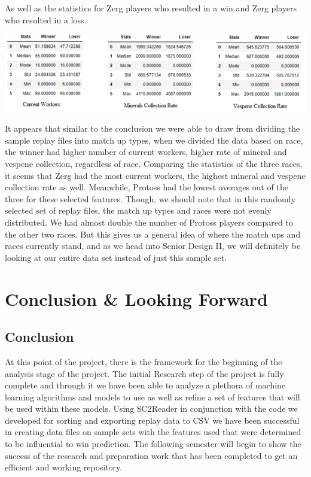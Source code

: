 \documentclass[a4paper,12pt]{report}
\begin{document}
As well as the statistics for Zerg players who resulted in a win and Zerg players who resulted in a loss. 

\begin{center}
    \captionsetup{type=figure}
    \includegraphics[width=.9\linewidth]{media/ZergWinnervsLoser.png}
\end{center}

It appears that similar to the conclusion we were able to draw from dividing the sample replay files into match up types, when we divided the data based on race, the winner had higher number of current workers, higher rate of mineral and vespene collection, regardless of race. Comparing the statistics of the three races, it seems that Zerg had the most current workers, the highest mineral and vespene collection rate as well. Meanwhile, Protoss had the lowest averages out of the three for these selected features. Though, we should note that in this randomly selected set of replay files, the match up types and races were not evenly distributed. We had almost double the number of Protoss players compared to the other two races. But this gives us a general idea of where the match ups and races currently stand, and as we head into Senior Design II, we will definitely be looking at our entire data set instead of just this sample set.

\chapter{Conclusion \& Looking Forward}

\section{Conclusion}
At this point of the project, there is the framework for the beginning of the analysis stage of the project. The initial Research step of the project is fully complete and through it we have been able to analyze a plethora of machine learning algorithms and models to use as well as refine a set of features that will be used within these models. Using SC2Reader in conjunction with the code we developed for sorting and exporting replay data to CSV we have been successful in creating data files on sample sets with the features used that were determined to be influential to win prediction. The following semester will begin to show the success of the research and preparation work that has been completed to get an efficient and working repository.
\end{document}
